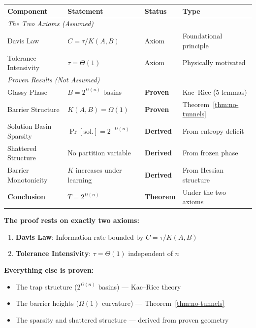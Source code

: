 \documentclass[11pt,a4paper]{article}
\theoremstyle{plain}
\theoremstyle{definition}
\theoremstyle{remark}
\begin{document}
\begin{center}
\begin{tabular}{llll}
\toprule
\textbf{Component} & \textbf{Statement} & \textbf{Status} & \textbf{Type} \\
\midrule
\multicolumn{4}{l}{\textit{The Two Axioms (Assumed)}} \\
Davis Law & $C = \tau/K(A,B)$ & Axiom & Foundational principle \\
Tolerance Intensivity & $\tau = \Theta(1)$ & Axiom & Physically motivated \\
\midrule
\multicolumn{4}{l}{\textit{Proven Results (Not Assumed)}} \\
Glassy Phase & $B = 2^{\Omega(n)}$ basins & \textbf{Proven} & Kac--Rice (5 lemmas) \\
Barrier Structure & $K(A,B) = \Omega(1)$ & \textbf{Proven} & Theorem~\ref{thm:no-tunnels} \\
Solution Basin Sparsity & $\Pr[\text{sol.}] = 2^{-\Omega(n)}$ & \textbf{Derived} & From entropy deficit \\
Shattered Structure & No partition variable & \textbf{Derived} & From frozen phase \\
Barrier Monotonicity & $K$ increases under learning & \textbf{Derived} & From Hessian structure \\
\midrule
\textbf{Conclusion} & $T = 2^{\Omega(n)}$ & \textbf{Theorem} & Under the two axioms \\
\bottomrule
\end{tabular}
\end{center}

\textbf{The proof rests on exactly two axioms:}
\begin{enumerate}
    \item \textbf{Davis Law}: Information rate bounded by $C = \tau/K(A,B)$
    \item \textbf{Tolerance Intensivity}: $\tau = \Theta(1)$ independent of $n$
\end{enumerate}

\textbf{Everything else is proven:}
\begin{itemize}
    \item The trap structure ($2^{\Omega(n)}$ basins) --- Kac--Rice theory
    \item The barrier heights ($\Omega(1)$ curvature) --- Theorem~\ref{thm:no-tunnels}
    \item The sparsity and shattered structure --- derived from proven geometry
\end{itemize}
\end{document}
